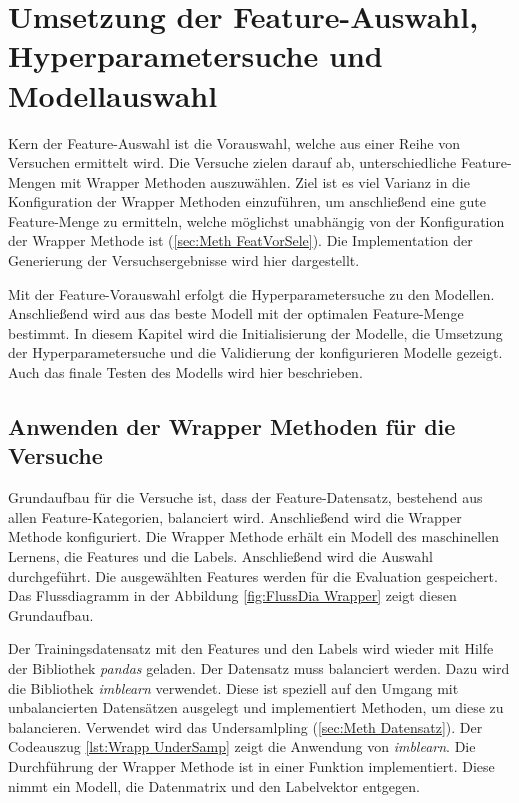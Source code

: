 \section{Umsetzung der Feature-Auswahl, Hyperparametersuche und Modellauswahl} \label{sec:umsetz FeatSelec}
Kern der Feature-Auswahl ist die Vorauswahl, welche aus einer Reihe von Versuchen ermittelt wird. Die Versuche zielen darauf ab, unterschiedliche Feature-Mengen mit Wrapper Methoden auszuwählen. Ziel ist es viel Varianz in die Konfiguration der Wrapper Methoden einzuführen, um anschließend eine gute Feature-Menge zu ermitteln, welche möglichst unabhängig von der Konfiguration der Wrapper Methode ist (\ref{sec:Meth FeatVorSele}). Die Implementation der Generierung der Versuchsergebnisse wird hier dargestellt. \par

Mit der Feature-Vorauswahl erfolgt die Hyperparametersuche zu den Modellen. Anschließend wird aus das beste Modell mit der optimalen Feature-Menge bestimmt. In diesem Kapitel wird die Initialisierung der Modelle, die Umsetzung der Hyperparametersuche und die Validierung der konfigurieren Modelle gezeigt. Auch das finale Testen des Modells wird hier beschrieben. 

\subsection{Anwenden der Wrapper Methoden für die Versuche}
Grundaufbau für die Versuche ist, dass der Feature-Datensatz, bestehend aus allen Feature-Kategorien, balanciert wird. Anschließend wird die Wrapper Methode konfiguriert. Die Wrapper Methode erhält ein Modell des maschinellen Lernens, die Features und die Labels. Anschließend wird die Auswahl durchgeführt. Die ausgewählten Features werden für die Evaluation gespeichert. Das Flussdiagramm in der Abbildung \ref{fig:FlussDia Wrapper} zeigt diesen Grundaufbau. 


Der Trainingsdatensatz mit den Features und den Labels wird wieder mit Hilfe der Bibliothek \textit{pandas} geladen. Der Datensatz muss balanciert werden. Dazu wird die Bibliothek \textit{imblearn} verwendet. Diese ist speziell auf den Umgang mit unbalancierten Datensätzen ausgelegt und implementiert Methoden, um diese zu balancieren. Verwendet wird das Undersamlpling (\ref{sec:Meth Datensatz}). Der Codeauszug \ref{lst:Wrapp UnderSamp} zeigt die Anwendung von \textit{imblearn}. Die Durchführung der Wrapper Methode ist in einer Funktion implementiert. Diese nimmt ein Modell, die Datenmatrix und den Labelvektor entgegen. 

